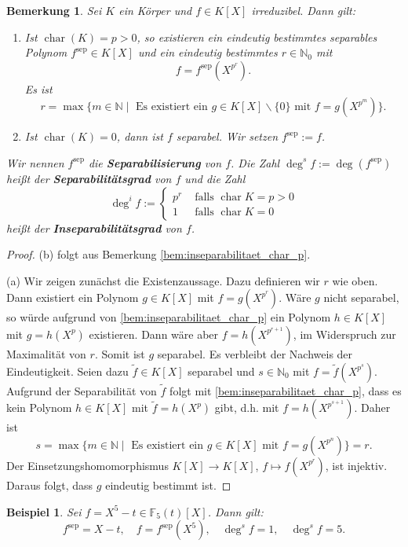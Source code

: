 \documentclass[a4paper, twoside, 11pt, ngerman]{report}
\newcommand{\FF}{\mathds F}
\newcommand{\NN}{\mathds N}
\renewcommand{\setminus}{\smallsetminus}
\DeclareMathOperator{\charact}{char}
\DeclareMathOperator{\sep}{sep}
\theoremstyle{definistyle}
\newtheorem{bem}[satz]{Bemerkung}
\newtheorem{bsp}[satz]{Beispiel}
\theoremstyle{remark}
\newcommand{\defn}[1]{\textit{\bfseries #1}}
\begin{document}
\begin{bem}\label{bem:separabilisierung}
Sei $K$ ein Körper und $f \in K[X]$ irreduzibel. Dann gilt:
\begin{enumerate}
\item[(a)] Ist $\charact(K)=p>0$, so existieren ein eindeutig bestimmtes separables Polynom $f^{\sep} \in K[X]$ und ein eindeutig bestimmtes $r\in\NN_0$ mit \[f = f^{\sep}(X^{p^r}).\]
Es ist 
\[
r = \max\{m \in \mathbb{N} \mid \text{ Es existiert ein } g \in K[X]\setminus\{0\} \text{ mit } f=g(X^{p^m})\}.
\]

\item[(b)] Ist $\charact(K)=0$, dann ist $f$ separabel. Wir setzen $f^{\sep} := f$.
\end{enumerate}
Wir nennen $f^{\sep}$ die \defn{Separabilisierung} von $f$.  
Die Zahl $\deg^s f:=\deg(f^{\sep})$ heißt der \defn{Separabilitätsgrad} von $f$ und die Zahl
\[
\deg^i f:=
\begin{cases}
p^r &\text{ falls } \charact K=p>0\\
1   & \text{ falls } \charact K = 0
\end{cases}
\]
heißt der \defn{Inseparabilitätsgrad} von $f$.
\end{bem}

\begin{proof}
(b) folgt aus Bemerkung \ref{bem:inseparabilitaet_char_p}.

(a) Wir zeigen zunächst die Existenzaussage. Dazu definieren wir $r$ wie oben. Dann existiert ein Polynom $g \in K[X]$ mit $f = g(X^{p^r})$. Wäre $g$ nicht separabel, so würde aufgrund von \ref{bem:inseparabilitaet_char_p} ein Polynom $h \in K[X]$ mit $g = h(X^p)$ existieren. Dann wäre aber $f = h(X^{p^{r+1}})$, im Widerspruch zur Maximalität von $r$. Somit ist $g$ separabel. Es verbleibt der Nachweis der Eindeutigkeit. Seien dazu $\tilde{f} \in K[X]$ separabel und $s \in \NN_0$ mit $f = \tilde{f}(X^{p^{s}})$. Aufgrund der Separabilität von $\tilde f$ folgt mit \ref{bem:inseparabilitaet_char_p}, dass es kein Polynom $h\in K[X]$ mit $\tilde f=h(X^p)$ gibt, d.h. mit $f=h(X^{p^{s+1}})$. Daher ist
\[
s = \max \{m \in \NN \mid \text{ Es existiert ein } g \in K[X] \text{ mit } f = g(X^{p^n})\} = r.
\]
Der Einsetzungshomomorphismus $K[X] \to K[X]$, $f \mapsto f(X^{p^r})$, ist injektiv. Daraus folgt, dass $g$ eindeutig bestimmt ist.
\end{proof}

\begin{bsp}\label{bsp:beispiel_separabel}
Sei $f = X^5 - t \in \FF_5(t)[X]$. Dann gilt:
\[
f^{\sep} = X - t, \quad f = f^{\sep}(X^5), \quad \deg^s f = 1, \quad \deg^s f = 5.
\]
\end{bsp}
\end{document}
